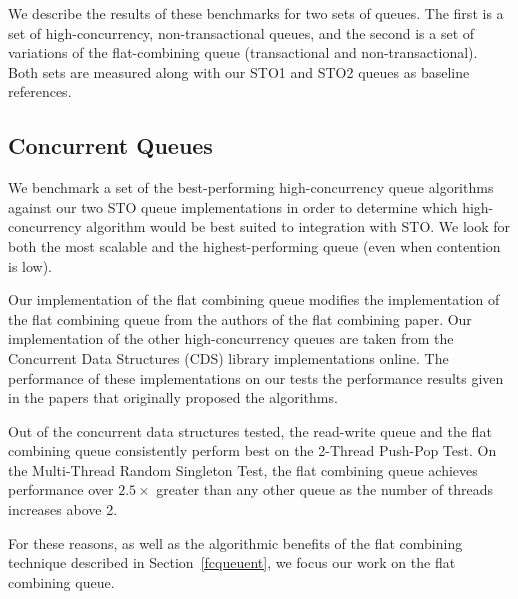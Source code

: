 We describe the results of these benchmarks for two sets of queues. The first is a set of high-concurrency, non-transactional queues, and the second is a set of variations of the flat-combining queue (transactional and non-transactional). Both sets are measured along with our STO1 and STO2 queues as baseline references.

\subsection{Concurrent Queues}

We benchmark a set of the best-performing high-concurrency queue algorithms against our two STO queue implementations in order to determine which high-concurrency algorithm would be best suited to integration with STO. We look for both the most scalable and the highest-performing queue (even when contention is low).
 
 Our implementation of the flat combining queue modifies the implementation of the flat combining queue from the authors of the flat combining paper\cite{flatcombining}. Our implementation of the other high-concurrency queues are taken from the Concurrent Data Structures (CDS) library implementations online\cite{libcds}. The performance of these implementations on our tests the performance results given in the papers that originally proposed the algorithms.
\iffalse
\begin{figure}[ht!]
\centering
\texttt{[image: concurrent/Q:PushPop.png]}
\caption{Performance of Concurrent Queue Algorithms}
\label{fig:concurrent_queues_pushpop}
\end{figure}

\begin{figure}[ht!]
\centering
\texttt{[image: concurrent/Q:RandSingleOps10000.png]}
\texttt{[image: concurrent/Q:RandSingleOps50000.png]}
\texttt{[image: concurrent/Q:RandSingleOps100000.png]}
\caption{Performance of Concurrent Queue Algorithms}
\label{fig:concurrent_queues_rand}
\end{figure}
\fi
Out of the concurrent data structures tested, the read-write queue\cite{queue1} and the flat combining queue consistently perform best on the 2-Thread Push-Pop Test. On the Multi-Thread Random Singleton Test, the flat combining queue achieves performance over $2.5\times$ greater than any other queue as the number of threads increases above 2.

For these reasons, as well as the algorithmic benefits of the flat combining technique described in Section~\ref{fcqueuent}, we focus our work on the flat combining queue.

